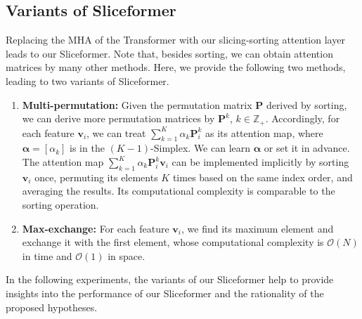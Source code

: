 \subsection{Variants of Sliceformer}\label{ssec:variants}
Replacing the MHA of the Transformer with our slicing-sorting attention layer leads to our Sliceformer. 
Note that, besides sorting, we can obtain attention matrices by many other methods. 
Here, we provide the following two methods, leading to two variants of Sliceformer. 
\begin{enumerate}
    \item \textbf{Multi-permutation:} 
    Given the permutation matrix $\bm{P}$ derived by sorting, we can derive more permutation matrices by $\bm{P}^{k}$, $k\in\mathbb{Z}_{+}$. 
    Accordingly, for each feature $\bm{v}_i$, we can treat $\sum_{k=1}^{K}\alpha_k\bm{P}_{i}^{k}$ as its attention map, where $\bm{\alpha}=[\alpha_k]$ is in the $(K-1)$-Simplex. 
    We can learn $\bm{\alpha}$ or set it in advance.
    The attention map $\sum_{k=1}^{K}\alpha_k\bm{P}_{i}^{k}\bm{v}_i$ can be implemented implicitly by sorting $\bm{v}_i$ once, permuting its elements $K$ times based on the same index order, and averaging the results.
    Its computational complexity is comparable to the sorting operation.
    \item \textbf{Max-exchange:} 
    For each feature $\bm{v}_i$, we find its maximum element and exchange it with the first element, whose computational complexity is $\mathcal{O}(N)$ in time and $\mathcal{O}(1)$ in space. 
\end{enumerate}
In the following experiments, the variants of our Sliceformer help to provide insights into the performance of our Sliceformer and the rationality of the proposed hypotheses.
